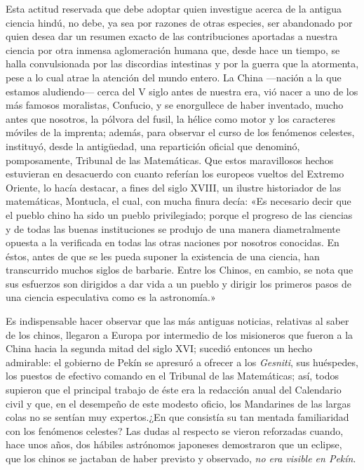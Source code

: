 \documentclass[a4paper, 12pt, draft]{article}
\begin{document}
{%

Esta actitud reservada que debe adoptar quien investigue acerca de la antigua ciencia hindú, no debe, ya sea por razones de otras especies, ser abandonado por quien desea dar un resumen exacto de las contribuciones aportadas a nuestra ciencia por otra inmensa aglomeración humana que, desde hace un tiempo, se halla convulsionada por las discordias intestinas y por la guerra que la atormenta, pese a lo cual atrae la atención del mundo entero. La China ---nación a la que estamos aludiendo--- cerca del V siglo antes de nuestra era, vió nacer a uno de los más famosos moralistas, Confucio, y se enorgullece de haber inventado, mucho antes que nosotros, la pólvora del fusil, la hélice como motor y los caracteres móviles de la imprenta; además, para
observar el curso de los fenómenos celestes, instituyó, desde la antigüedad, una repartición oficial que denominó, pomposamente, Tribunal de las Matemáticas. Que estos maravillosos hechos estuvieran en desacuerdo con cuanto referían los europeos vueltos del Extremo Oriente, lo hacía destacar, a fines del siglo XVIII, un ilustre historiador de las matemáticas, Montucla, el cual, con mucha finura decía: «Es necesario decir que el pueblo chino ha sido un pueblo privilegiado; porque el progreso de las ciencias y de todas las buenas instituciones se produjo de una manera diametralmente opuesta a la verificada en todas las otras naciones por nosotros conocidas. En éstos, antes de que se les pueda suponer la existencia de una ciencia, han transcurrido muchos siglos de barbarie. Entre los Chinos, en cambio, se nota que sus esfuerzos son dirigidos a dar vida a un pueblo y dirigir los primeros pasos de una ciencia especulativa como es la astronomía.»

Es indispensable hacer observar que las más antiguas noticias, relativas al saber de los chinos, llegaron a Europa por intermedio de los misioneros que fueron a la China hacia la segunda mitad del siglo XVI; sucedió entonces un hecho admirable: el gobierno de Pekín se apresuró a ofrecer a los \textit{ Gesniti}, sus huéspedes, los puestos de efectivo comando en el Tribunal de las Matemáticas; así, todos supieron que el principal trabajo de éste era la redacción anual del Calendario civil y que, en el desempeño de este modesto oficio, los Mandarines de las largas colas no se sentían muy expertos.¿En que consistía su tan mentada familiaridad con los fenómenos celestes? Las dudas al respecto se vieron 
reforzadas cuando, hace unos años, dos hábiles astrónomos japoneses demostraron que un eclipse, que
los chinos se jactaban de haber previsto y observado,
\textit{ no era visible en Pekín}.

}
\end{document}
